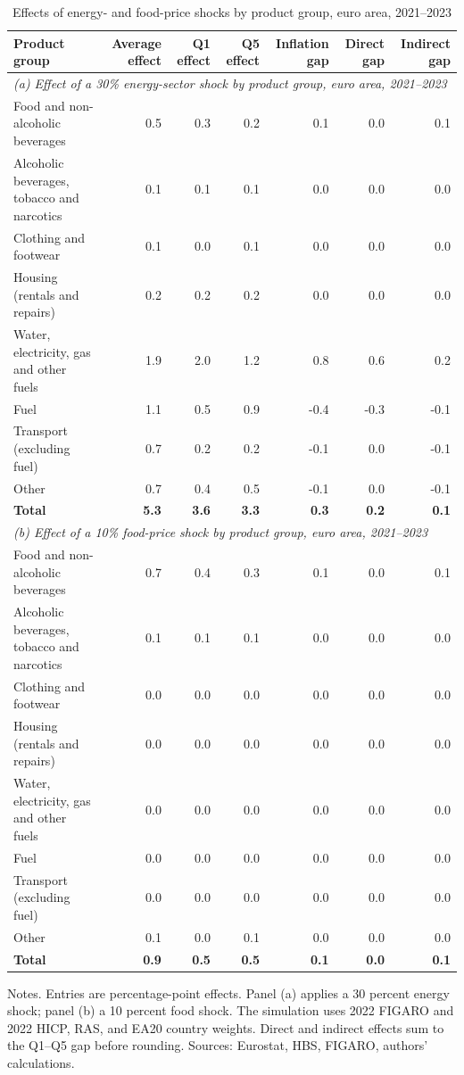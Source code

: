 \begin{table}[H]

\caption{\label{tab:shock-oil-gas-chain-ea20}Effects of energy- and food-price shocks by product group, euro area, 2021--2023}
\centering
\scriptsize
\setlength{\tabcolsep}{3.0pt}
\begin{tabular}[t]{lrrrrrr}
\toprule
Product group & Average effect & Q1 effect & Q5 effect & Inflation gap & Direct gap & Indirect gap\\
\midrule
\multicolumn{7}{l}{\textit{(a) Effect of a 30\% energy-sector shock by product group, euro area, 2021--2023}}\\
Food and non-alcoholic beverages & 0.5 & 0.3 & 0.2 & 0.1 & 0.0 & 0.1\\
Alcoholic beverages, tobacco and narcotics & 0.1 & 0.1 & 0.1 & 0.0 & 0.0 & 0.0\\
Clothing and footwear & 0.1 & 0.0 & 0.1 & 0.0 & 0.0 & 0.0\\
Housing (rentals and repairs) & 0.2 & 0.2 & 0.2 & 0.0 & 0.0 & 0.0\\
Water, electricity, gas and other fuels & 1.9 & 2.0 & 1.2 & 0.8 & 0.6 & 0.2\\
Fuel & 1.1 & 0.5 & 0.9 & -0.4 & -0.3 & -0.1\\
Transport (excluding fuel) & 0.7 & 0.2 & 0.2 & -0.1 & 0.0 & -0.1\\
Other & 0.7 & 0.4 & 0.5 & -0.1 & 0.0 & -0.1\\
\textbf{Total} & \textbf{5.3} & \textbf{3.6} & \textbf{3.3} & \textbf{0.3} & \textbf{0.2} & \textbf{0.1}\\
\midrule
\multicolumn{7}{l}{\textit{(b) Effect of a 10\% food-price shock by product group, euro area, 2021--2023}}\\
Food and non-alcoholic beverages & 0.7 & 0.4 & 0.3 & 0.1 & 0.0 & 0.1\\
Alcoholic beverages, tobacco and narcotics & 0.1 & 0.1 & 0.1 & 0.0 & 0.0 & 0.0\\
Clothing and footwear & 0.0 & 0.0 & 0.0 & 0.0 & 0.0 & 0.0\\
Housing (rentals and repairs) & 0.0 & 0.0 & 0.0 & 0.0 & 0.0 & 0.0\\
Water, electricity, gas and other fuels & 0.0 & 0.0 & 0.0 & 0.0 & 0.0 & 0.0\\
Fuel & 0.0 & 0.0 & 0.0 & 0.0 & 0.0 & 0.0\\
Transport (excluding fuel) & 0.0 & 0.0 & 0.0 & 0.0 & 0.0 & 0.0\\
Other & 0.1 & 0.0 & 0.1 & 0.0 & 0.0 & 0.0\\
\textbf{Total} & \textbf{0.9} & \textbf{0.5} & \textbf{0.5} & \textbf{0.1} & \textbf{0.0} & \textbf{0.1}\\
\bottomrule
\end{tabular}
\par\vspace{0.35em}\footnotesize\noindent Notes. Entries are percentage-point effects. Panel (a) applies a 30 percent energy shock; panel (b) a 10 percent food shock. The simulation uses 2022 FIGARO and 2022 HICP, RAS, and EA20 country weights. Direct and indirect effects sum to the Q1--Q5 gap before rounding. Sources: Eurostat, HBS, FIGARO, authors' calculations.
\end{table}
